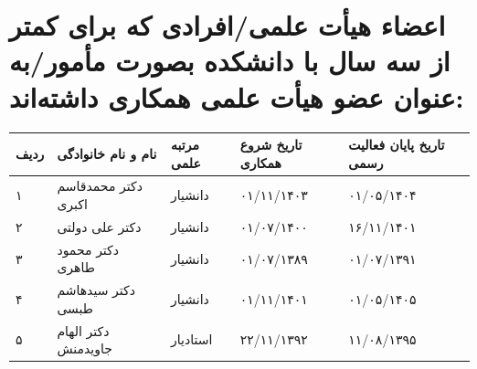 \documentclass[
  letterpaper,
  DIV=11,
  numbers=noendperiod]{scrreprt}
\newcounter{none} %
\begin{document}
\section{اعضاء هیأت علمی/افرادی که برای کمتر از سه سال با دانشکده بصورت
مأمور/به عنوان عضو هیأت علمی همکاری
داشته‌اند:}\label{ux627ux639ux636ux627ux621-ux647ux6ccux623ux62a-ux639ux644ux645ux6ccux627ux641ux631ux627ux62fux6cc-ux6a9ux647-ux628ux631ux627ux6cc-ux6a9ux645ux62aux631-ux627ux632-ux633ux647-ux633ux627ux644-ux628ux627-ux62fux627ux646ux634ux6a9ux62fux647-ux628ux635ux648ux631ux62a-ux645ux623ux645ux648ux631ux628ux647-ux639ux646ux648ux627ux646-ux639ux636ux648-ux647ux6ccux623ux62a-ux639ux644ux645ux6cc-ux647ux645ux6a9ux627ux631ux6cc-ux62fux627ux634ux62aux647ux627ux646ux62f}

{\def\LTcaptype{none} %
\begin{longtable}[]{@{}
  >{\raggedright\arraybackslash}p{}
  >{\raggedright\arraybackslash}p{}
  >{\raggedright\arraybackslash}p{}
  >{\raggedright\arraybackslash}p{}
  >{\raggedright\arraybackslash}p{}@{}}
\toprule\noalign{}
\begin{minipage}[b]{\linewidth}\raggedright
ردیف
\end{minipage} & \begin{minipage}[b]{\linewidth}\raggedright
نام و نام خانوادگی
\end{minipage} & \begin{minipage}[b]{\linewidth}\raggedright
مرتبه علمی
\end{minipage} & \begin{minipage}[b]{\linewidth}\raggedright
تاریخ شروع همکاری
\end{minipage} & \begin{minipage}[b]{\linewidth}\raggedright
تاریخ پایان فعالیت رسمی
\end{minipage} \\
\midrule\noalign{}
\endhead
\bottomrule\noalign{}
\endlastfoot
۱ & دکتر محمدقاسم اکبری & دانشیار & ۰۱/۱۱/۱۴۰۳ & ۰۱/۰۵/۱۴۰۴ \\
۲ & دکتر علی دولتی & دانشیار & ۰۱/۰۷/۱۴۰۰ & ۱۶/۱۱/۱۴۰۱ \\
۳ & دکتر محمود طاهری & دانشیار & ۰۱/۰۷/۱۳۸۹ & ۰۱/۰۷/۱۳۹۱ \\
۴ & دکتر سیدهاشم طبسی & دانشیار & ۰۱/۱۱/۱۴۰۱ & ۰۱/۰۵/۱۴۰۵ \\
۵ & دکتر الهام جاویدمنش & استادیار & ۲۲/۱۱/۱۳۹۲ & ۱۱/۰۸/۱۳۹۵ \\

\end{longtable}}
\end{document}
